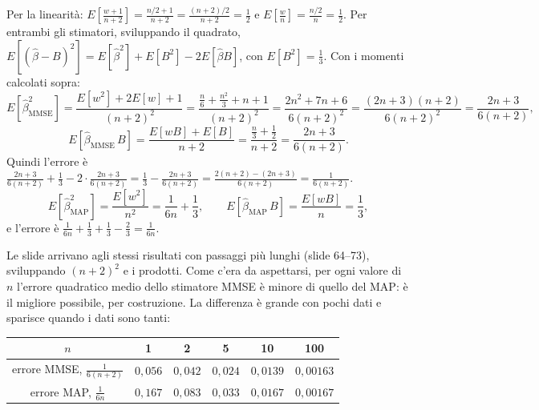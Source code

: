 
\begin{dimostrazione}
 Per la linearità: $E\left[ \frac{w + 1}{n + 2} \right] = \frac{n/2 + 1}{n + 2} = \frac{(n + 2)/2}{n +
2} = \frac12$ e $E\left[ \frac{w}{n} \right] = \frac{n/2}{n} = \frac12$.
 Per entrambi gli stimatori, sviluppando il quadrato,
$E[(\hat\beta - B)^2] = E[\hat\beta^2] + E[B^2] - 2E[\hat\beta B]$, con $E[B^2] = \frac13$.
 Con i momenti calcolati sopra:
\[ E\left[ \hat\beta_{\text{MMSE}}^2 \right] = \frac{E[w^2] + 2E[w] + 1}{(n + 2)^2} = \frac{\frac{n}{6} + \frac{n^2}{3}
   + n + 1}{(n + 2)^2} = \frac{2n^2 + 7n + 6}{6(n + 2)^2} = \frac{(2n + 3)(n + 2)}{6(n + 2)^2} = \frac{2n + 3}{6(n +
   2)} , \]
\[ E\left[ \hat\beta_{\text{MMSE}}\, B \right] = \frac{E[wB] + E[B]}{n + 2} = \frac{\frac{n}{3} + \frac12}{n + 2} =
   \frac{2n + 3}{6(n + 2)} . \]
Quindi l'errore è $\frac{2n + 3}{6(n + 2)} + \frac13 - 2 \cdot \frac{2n + 3}{6(n + 2)} = \frac13 - \frac{2n + 3}{6(n +
2)} = \frac{2(n + 2) - (2n + 3)}{6(n + 2)} = \frac{1}{6(n + 2)}$.
\[ E\left[ \hat\beta_{\text{MAP}}^2 \right] = \frac{E[w^2]}{n^2} = \frac{1}{6n} + \frac13 , \qquad E\left[
   \hat\beta_{\text{MAP}}\, B \right] = \frac{E[wB]}{n} = \frac13 , \]
e l'errore è $\frac{1}{6n} + \frac13 + \frac13 - \frac23 = \frac{1}{6n}$.
\end{dimostrazione}

Le slide arrivano agli stessi risultati con passaggi più lunghi (slide 64--73), sviluppando $(n + 2)^2$ e i prodotti.
Come c'era da aspettarsi, per ogni valore di $n$ l'errore quadratico medio dello stimatore MMSE è minore di quello del
MAP: è il migliore possibile, per costruzione. La differenza è grande con pochi dati e sparisce quando i dati sono
tanti:
\begin{center}
\renewcommand{\arraystretch}{1.3}
\begin{tabular}{@{}c|ccccc@{}}
  $n$ & 1 & 2 & 5 & 10 & 100 \\ \hline
  errore MMSE, $\frac{1}{6(n+2)}$ & $0{,}056$ & $0{,}042$ & $0{,}024$ & $0{,}0139$ & $0{,}00163$ \\
  errore MAP, $\frac{1}{6n}$ & $0{,}167$ & $0{,}083$ & $0{,}033$ & $0{,}0167$ & $0{,}00167$
\end{tabular}
\end{center}

